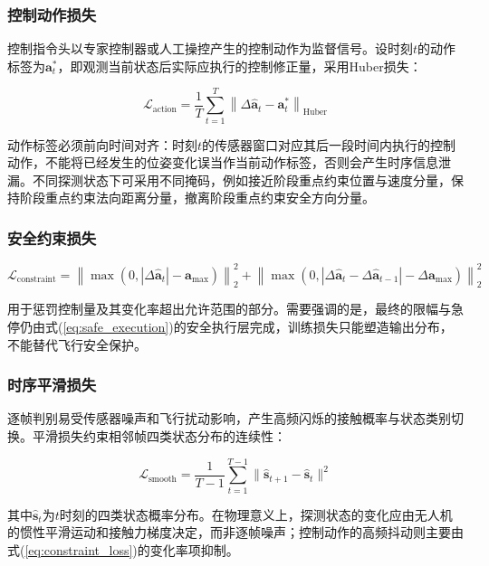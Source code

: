 \subsubsection{控制动作损失}

控制指令头以专家控制器或人工操控产生的控制动作为监督信号。设时刻$t$的动作标签为$\mathbf{a}^{*}_t$，即观测当前状态后实际应执行的控制修正量，采用Huber损失：

\begin{equation}
\mathcal{L}_{\text{action}} = \frac{1}{T} \sum_{t=1}^{T} \left\|\Delta\hat{\mathbf{a}}_t - \mathbf{a}^{*}_t\right\|_{\text{Huber}}
\label{eq:action_loss}
\end{equation}

动作标签必须前向时间对齐：时刻$t$的传感器窗口对应其后一段时间内执行的控制动作，不能将已经发生的位姿变化误当作当前动作标签，否则会产生时序信息泄漏。不同探测状态下可采用不同掩码，例如接近阶段重点约束位置与速度分量，保持阶段重点约束法向距离分量，撤离阶段重点约束安全方向分量。

\subsubsection{安全约束损失}

\begin{equation}
\mathcal{L}_{\text{constraint}} = \left\|\max\left(0, |\Delta\hat{\mathbf{a}}_t|-\mathbf{a}_{\max}\right)\right\|_2^2 + \left\|\max\left(0, |\Delta\hat{\mathbf{a}}_t-\Delta\hat{\mathbf{a}}_{t-1}|-\Delta\mathbf{a}_{\max}\right)\right\|_2^2
\label{eq:constraint_loss}
\end{equation}

用于惩罚控制量及其变化率超出允许范围的部分。需要强调的是，最终的限幅与急停仍由式(\ref{eq:safe_execution})的安全执行层完成，训练损失只能塑造输出分布，不能替代飞行安全保护。

\subsubsection{时序平滑损失}

逐帧判别易受传感器噪声和飞行扰动影响，产生高频闪烁的接触概率与状态类别切换。平滑损失约束相邻帧四类状态分布的连续性：

\begin{equation}
\mathcal{L}_{\text{smooth}} = \frac{1}{T-1} \sum_{t=1}^{T-1} \|\hat{\mathbf{s}}_{t+1} - \hat{\mathbf{s}}_t\|^2
\label{eq:smooth_loss}
\end{equation}

其中$\hat{\mathbf{s}}_t$为$t$时刻的四类状态概率分布。在物理意义上，探测状态的变化应由无人机的惯性平滑运动和接触力梯度决定，而非逐帧噪声；控制动作的高频抖动则主要由式(\ref{eq:constraint_loss})的变化率项抑制。

